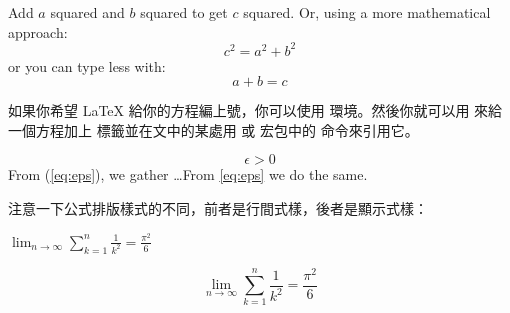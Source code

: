 \begin{example}
Add $a$ squared and $b$ squared
to get $c$ squared. Or, using
a more mathematical approach:
\begin{displaymath}
c^{2}=a^{2}+b^{2}
\end{displaymath}
or you can type less with:
\[a+b=c\]
\end{example}


如果你希望 \LaTeX{} 給你的方程編上號，你可以使用  環境。然後你就可以用  來給一個方程加上
標籤並在文中的某處用  或  宏包中的  命令來引用它。
\begin{example}
\begin{equation} \label{eq:eps}
\epsilon > 0
\end{equation}
From (\ref{eq:eps}), we gather
\ldots{}From \eqref{eq:eps} we
do the same.
\end{example}

注意一下公式排版樣式的不同，前者是行間式樣，後者是顯示式樣：
\begin{example}
$\lim_{n \to \infty}
\sum_{k=1}^n \frac{1}{k^2}
= \frac{\pi^2}{6}$
\end{example}
\begin{example}
\begin{displaymath}
\lim_{n \to \infty}
\sum_{k=1}^n \frac{1}{k^2}
= \frac{\pi^2}{6}
\end{displaymath}
\end{example}



